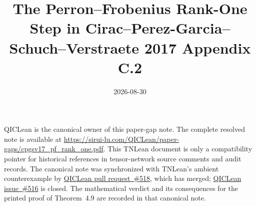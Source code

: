 \documentclass{article}
\title{The Perron--Frobenius Rank-One Step in Cirac--Perez-Garcia--Schuch--Verstraete 2017 Appendix C.2}
\author{}
\date{2026-08-30}
\begin{document}
\maketitle
{}

QICLean is the canonical owner of this paper-gap note. The complete resolved
note is available at
\url{https://sirui-lu.com/QICLean/paper-gaps/cpgsv17_pf_rank_one.pdf}.
This TNLean document is only a compatibility pointer for historical references
in tensor-network source comments and audit records. The canonical note was
synchronized with TNLean's ambient counterexample by
\href{https://github.com/LionSR/QICLean/pull/518}{QICLean pull request~\#518},
which has merged;
\href{https://github.com/LionSR/QICLean/issues/516}{QICLean issue~\#516} is
closed. The mathematical verdict and its consequences for the printed proof
of Theorem~4.9 are recorded in that canonical note.
\end{document}
